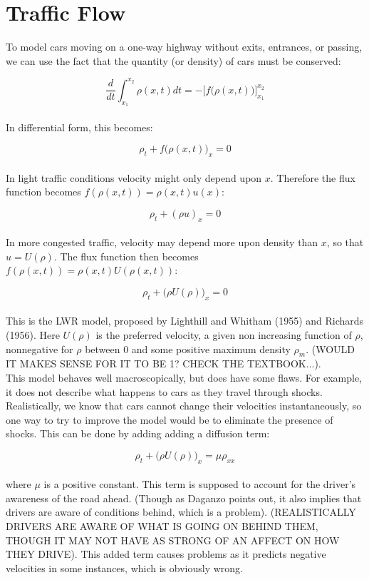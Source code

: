 \documentclass{article}
\begin{document}
\section{Traffic Flow}

To model cars moving on a one-way highway without exits, entrances, or passing, we can use the fact that the quantity (or density) of cars must be conserved:

\[ \frac{d}{dt} \int_{x_1}^{x_2} \rho(x,t) dt = -\Bigg[ f\Big(\rho(x,t)\Big) \Bigg]_{x_1}^{x_2} \] \\

In differential form, this becomes:

\[ \rho_t + f \Big( \rho(x,t) \Big)_x = 0 \] \\

In light traffic conditions velocity might only depend upon $x$.  Therefore the flux function becomes $f(\rho(x,t)) = \rho(x,t) u(x)$:

\[ \rho_t + (\rho u)_x = 0 \] \\

In more congested traffic, velocity may depend more upon density than $x$, so that $u = U(\rho)$.  The flux function then becomes $f(\rho(x,t)) = \rho(x,t) U(\rho(x,t))$:

\[ \rho_t + \Big( \rho U(\rho) \Big)_x = 0 \] \\

This is the LWR model, proposed by Lighthill and Whitham (1955) and Richards (1956).  Here $U(\rho)$ is the preferred velocity, a given non increasing function of $\rho$, nonnegative for $\rho$ between 0 and some positive maximum density $\rho_m$. (WOULD IT MAKES SENSE FOR IT TO BE 1? CHECK THE TEXTBOOK...). \\

This model behaves well macroscopically, but does have some flaws.  For example, it does not describe what happens to cars as they travel through shocks.  Realistically, we know that cars cannot change their velocities instantaneously, so one way to try to improve the model would be to eliminate the presence of shocks.  This can be done by adding adding a diffusion term:

\[ \rho_t + \Big( \rho U(\rho) \Big)_x = \mu \rho_{xx} \] \\

where $\mu$ is a positive constant.  This term is supposed to account for the driver's awareness of the road ahead.  (Though as Daganzo points out, it also implies that drivers are aware of conditions behind, which is a problem).  (REALISTICALLY DRIVERS ARE AWARE OF WHAT IS GOING ON BEHIND THEM, THOUGH IT MAY NOT HAVE AS STRONG OF AN AFFECT ON HOW THEY DRIVE).  This added term causes problems as it predicts negative velocities in some instances, which is obviously wrong.
\end{document}
